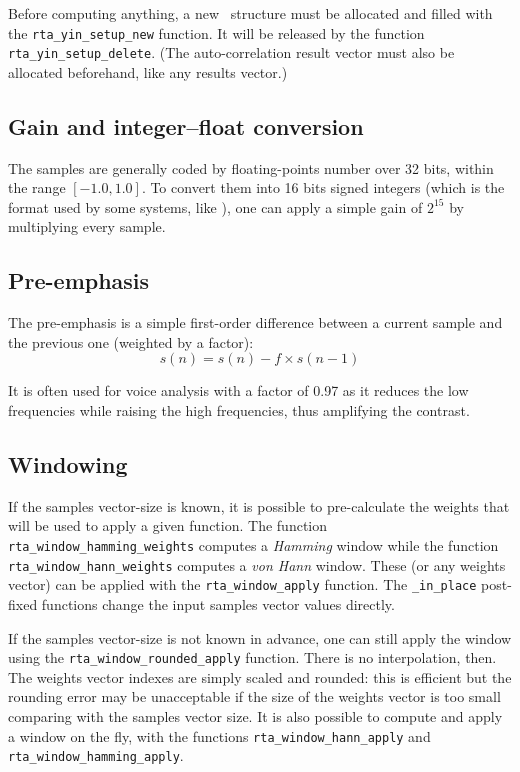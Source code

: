 \documentclass[a4paper, twoside]{article}
\begin{document}
Before computing anything, a new \yin\ structure must be
allocated and filled with the \texttt{rta\_yin\_setup\_new}
function. It will be released by the function
\texttt{rta\_yin\_setup\_delete}. (The auto-correlation result vector
must also be allocated beforehand, like any results vector.)

\subsection{Gain and integer--float conversion}
\label{sec:gain}

The samples are generally coded by floating-points number over 32
bits, within the range $[-1.0, 1.0]$. To convert them into 16 bits
signed integers (which is the format used by some systems, like
\htk), one can apply a simple gain of $2^{15}$ by multiplying
every sample.

\subsection{Pre-emphasis}
\label{sec:preemphasis}

The pre-emphasis is a simple first-order difference between a current
sample and the previous one (weighted by a factor):
$$s(n) = s(n) - f \times s(n-1)$$

It is often used for voice analysis with a factor of 0.97 as it
reduces the low frequencies while raising the high frequencies, thus
amplifying the contrast.

\subsection{Windowing}
\label{sec:windowing}

If the samples vector-size is known, it is possible to pre-calculate
the weights that will be used to apply a given function. The function
\texttt{rta\_window\_hamming\_weights} computes a \textit{Hamming}
window while the function \texttt{rta\_window\_hann\_weights} computes
a \textit{von Hann} window. These (or any weights vector) can be
applied with the \texttt{rta\_window\_apply} function. The
\texttt{\_in\_place} post-fixed functions change the input samples
vector values directly.

If the samples vector-size is not known in advance, one can still
apply the window using the \texttt{rta\_window\_rounded\_apply}
function. There is no interpolation, then. The weights vector indexes
are simply scaled and rounded: this is efficient but the rounding
error may be unacceptable if the size of the weights vector is too
small comparing with the samples vector size. It is also possible to
compute and apply a window on the fly, with the functions
\texttt{rta\_window\_hann\_apply} and
\texttt{rta\_window\_hamming\_apply}.
\end{document}
